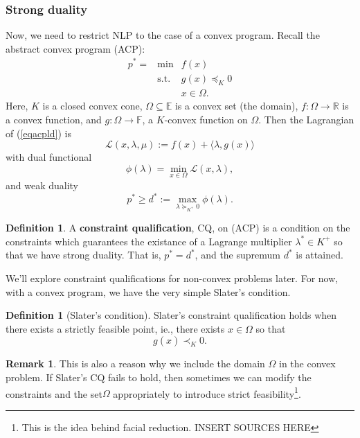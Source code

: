 \documentclass{article}
\numberwithin{equation}{section}
\theoremstyle{definition}
\newtheorem{definition}[theorem]{Definition}%
\newtheorem{remark}[theorem]{Remark}
\newcommand{\bE}{\mathbb{E}}
\newcommand{\bF}{\mathbb{F}}
\newcommand{\bR}{\mathbb{R}}
\newcommand{\cL}{\mathcal{L}}
\newcommand{\tst}{\text{s.t.}}
\begin{document}
\subsubsection{Strong duality}
Now, we need to restrict NLP to the case of a convex program. Recall the abstract convex program (ACP):
\begin{equation}
    \label{eqacpld}
    \begin{array}{ccc}
         p^*=&\min & f(x)  \\
         &\tst & g(x)\preceq_K 0\\
           &   & x\in\Omega.
    \end{array}
\end{equation}
Here, $K$ is a closed convex cone, $\Omega\subseteq\bE$ is a convex set (the domain), $f:\Omega\to\bR$ is a convex function, and $g:\Omega\to\bF$, a $K$-convex function on $\Omega$. Then the Lagrangian of (\ref{eqacpld}) is
\begin{equation}
    \cL(x,\lambda,\mu):=f(x)+\langle \lambda, g(x)\rangle
\end{equation}
with dual functional 
\begin{equation}
    \phi(\lambda)=\min_{x\in\Omega}\cL(x,\lambda),
\end{equation}
and weak duality
\begin{equation}
    p^*\ge d^*:=\max_{\lambda\succeq_{K^+}0}\phi(\lambda).
\end{equation}
\begin{definition}
    A \textbf{constraint qualification}, CQ, on (ACP) is a condition on the constraints which guarantees the existance of a Lagrange multiplier $\lambda^*\in K^+$ so that we have strong duality. That is, $p^*=d^*$, and the supremum $d^*$ is attained.
\end{definition}
We'll explore constraint qualifications for non-convex problems later. For now, with a convex program, we have the very simple Slater's condition.
\begin{definition}[Slater's condition]
    Slater's constraint qualification holds when there exists a strictly feasible point, ie., there exists $\widehat x\in\Omega$ so that \begin{equation}
        g(\widehat x)\prec_K0.
    \end{equation}
\end{definition}
\begin{remark}
    This is also a reason why we include the domain $\Omega$ in the convex problem. If Slater's CQ fails to hold, then sometimes we can modify the constraints and the set$\Omega$ appropriately to introduce strict feasibility\footnote{This is the idea behind facial reduction. INSERT SOURCES HERE}.
\end{remark}
\end{document}
